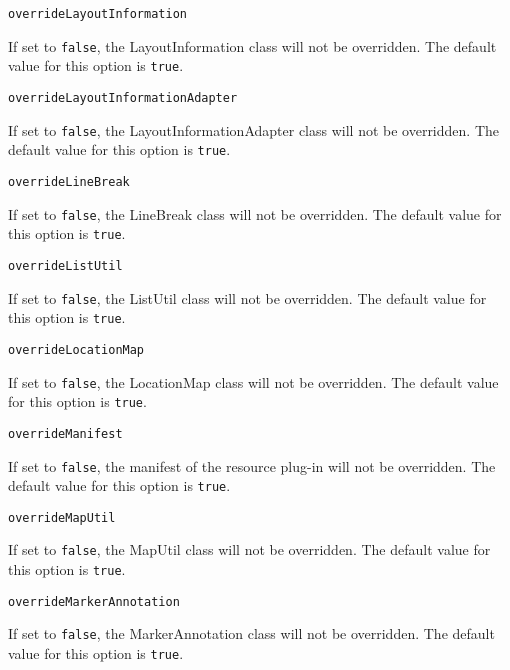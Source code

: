 \noindent\texttt{overrideLayoutInformation}
\begin{myindentpar}{1cm}
If set to \texttt{false}, the LayoutInformation class will not be overridden. The default value for this option is \texttt{true}.
\end{myindentpar}

\noindent\texttt{overrideLayoutInformationAdapter}
\begin{myindentpar}{1cm}
If set to \texttt{false}, the LayoutInformationAdapter class will not be overridden. The default value for this option is \texttt{true}.
\end{myindentpar}

\noindent\texttt{overrideLineBreak}
\begin{myindentpar}{1cm}
If set to \texttt{false}, the LineBreak class will not be overridden. The default value for this option is \texttt{true}.
\end{myindentpar}

\noindent\texttt{overrideListUtil}
\begin{myindentpar}{1cm}
If set to \texttt{false}, the ListUtil class will not be overridden. The default value for this option is \texttt{true}.
\end{myindentpar}

\noindent\texttt{overrideLocationMap}
\begin{myindentpar}{1cm}
If set to \texttt{false}, the LocationMap class will not be overridden. The default value for this option is \texttt{true}.
\end{myindentpar}

\noindent\texttt{overrideManifest}
\begin{myindentpar}{1cm}
If set to \texttt{false}, the manifest of the resource plug-in will not be overridden. The default value for this option is \texttt{true}.
\end{myindentpar}

\noindent\texttt{overrideMapUtil}
\begin{myindentpar}{1cm}
If set to \texttt{false}, the MapUtil class will not be overridden. The default value for this option is \texttt{true}.
\end{myindentpar}

\noindent\texttt{overrideMarkerAnnotation}
\begin{myindentpar}{1cm}
If set to \texttt{false}, the MarkerAnnotation class will not be overridden. The default value for this option is \texttt{true}.
\end{myindentpar}

